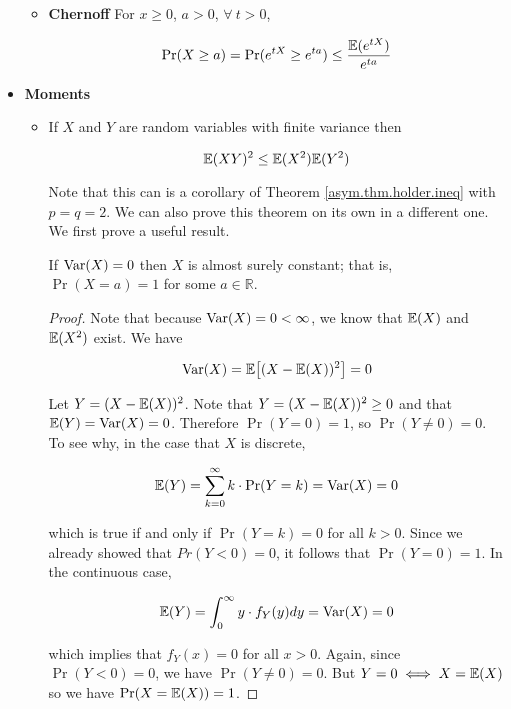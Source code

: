 \begin{itemize}
\begin{itemize}
\item \begin{theorem} \textbf{Chernoff} For \(x \geq 0\), \(a > 0\), \(\forall \ t > 0\),

\[
\Pr(X \geq a) = \Pr( e^{tX} \geq e^{ta} ) \leq \frac{\mathbb{E}(e^{tX})}{e^{ta}}
\]
\end{theorem} 
\end{itemize}

\item \textbf{Moments}

\begin{itemize}

\item \begin{theorem} \label{asym.cauchy.schwarz} If \(X\) and \(Y\) are random variables with finite variance then

\[
\mathbb{E}(XY)^2 \leq \mathbb{E}(X^2) \mathbb{E}(Y^2)
\]
\end{theorem}

Note that this can is a corollary of Theorem \ref{asym.thm.holder.ineq} with \(p = q = 2\). We can also prove this theorem on its own in a different one. We first prove a useful result.

\begin{lemma}\label{asym.cauchy.lemma}If \(\mathrm{Var}(X) = 0\) then \(X\) is almost surely constant; that is, \(\Pr(X = a) = 1\) for some \(a \in \mathbb{R}\).
\end{lemma}

\begin{proof}
Note that because \(\mathrm{Var}(X) = 0 < \infty\), we know that \(\mathbb{E}(X)\) and \(\mathbb{E}(X^2)\) exist. We have

\[
\mathrm{Var}(X) = \mathbb{E}\big[ (X - \mathbb{E}(X))^2 \big] = 0
\]

Let \(Y = (X - \mathbb{E}(X))^2 \). Note that \(Y = (X - \mathbb{E}(X))^2 \geq 0\) and that \(\mathbb{E}(Y) = \mathrm{Var}(X) = 0\). Therefore \(\Pr(Y=0) = 1\), so \(\Pr(Y \neq 0) = 0\). To see why, in the case that \(X\) is discrete,

\[
\mathbb{E}(Y) = \sum_{k=0}^\infty k \cdot \Pr(Y=k) = \mathrm{Var}(X) = 0 
\]

which is true if and only if \(\Pr(Y=k) = 0\) for all \(k > 0\). Since we already showed that \(Pr(Y < 0) = 0\), it follows that \(\Pr(Y=0) = 1\). In the continuous case,

\[
\mathbb{E}(Y) = \int_{0}^\infty y \cdot f_Y(y) dy = \mathrm{Var}(X) = 0 
\]

which implies that \(f_Y(x) = 0\) for all \(x > 0\). Again, since \(\Pr(Y < 0) = 0\), we have \(\Pr(Y \neq 0) = 0\). But \(Y = 0 \iff X = \mathbb{E}(X)\) so we have \(\Pr(X = \mathbb{E}(X)) = 1\).
\end{proof}


\end{itemize}
\end{itemize}
